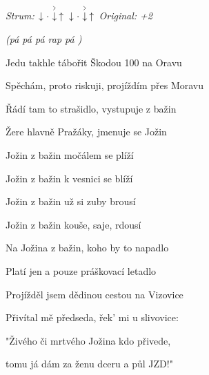\begin{song}


 \quad
\textit{Strum:} $\Down\Miss\AccentDown\Up\ \Down\Miss\AccentDown\Up$ \quad
\textit{Original: +2}

\large

\begin{chordbox}
\par
{}\par
{}\par
{}\par
{}\par
{}\par
\end{chordbox}

\Large

\bigskip

 \textit{(pá pá pá rap pá )} \par
{}Jedu takhle tábořit Škodou 100 na Oravu \par
{}Spěchám, proto riskuji, projíždím přes Moravu \par
{}Řádí tam to strašidlo, vystupuje z bažin \par
{}Žere hlavně Pražáky, jmenuje se Jožin \par

\bigskip

\begin{chorusbox}{\Refren}
Jožin z bažin močálem se plíží \par
{}Jožin z bažin k vesnici se blíží \par
{}Jožin z bažin už si zuby brousí \par
{}Jožin z bažin kouše, saje, rdousí \par
{}Na Jožina z bažin, koho by to napadlo  \par
{}Platí jen a pouze práškovací letadlo  \par
\end{chorusbox}

\bigskip

 \par
{}Projížděl jsem dědinou cestou na Vizovice \par
{}Přivítal mě předseda, řek' mi u slivovice: \par
{}"Živého či mrtvého Jožina kdo přivede, \par
{}tomu já dám za ženu dceru a půl JZD!" \par



\end{song}
